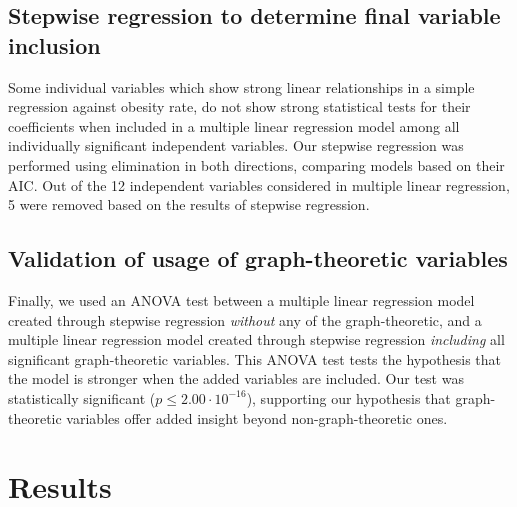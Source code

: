 \documentclass[oneside,12pt]{report}
\begin{document}
\section*{Stepwise regression to determine final variable inclusion}

Some individual variables which show strong linear relationships in a simple regression against obesity rate, do not show strong statistical tests for their coefficients when included in a multiple linear regression model among all individually significant independent variables. Our stepwise regression was performed using elimination in both directions, comparing models based on their AIC. Out of the 12 independent variables considered in multiple linear regression, 5 were removed based on the results of stepwise regression.

\section*{Validation of usage of graph-theoretic variables}

Finally, we used an ANOVA test between a multiple linear regression model created through stepwise regression \emph{without} any of the graph-theoretic, and a multiple linear regression model created through stepwise regression \emph{including} all significant graph-theoretic variables. This ANOVA test tests the hypothesis that the model is stronger when the added variables are included. Our test was statistically significant (\begin{math}p\leq2.00\cdot10^{-16}\end{math}), supporting our hypothesis that graph-theoretic variables offer added insight beyond non-graph-theoretic ones.

\chapter{Results}
\end{document}
